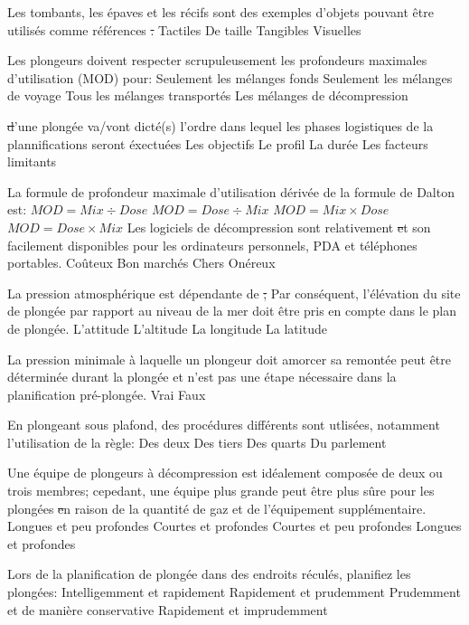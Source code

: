 \documentclass[english,10pt,twoside]{article}
\begin{document}
\begin{outline}
		\1 Les tombants, les épaves et les récifs sont des exemples d'objets pouvant être utilisés comme références \st.
			\2 Tactiles
			\2 De taille
			\2 Tangibles
			\2 Visuelles

		\1 Les plongeurs doivent respecter scrupuleusement les profondeurs maximales d'utilisation (MOD) pour:
			\2 Seulement les mélanges fonds
			\2 Seulement les mélanges de voyage
			\2 Tous les mélanges transportés
			\2 Les mélanges de décompression

		\1 \st d'une plongée va/vont dicté(s) l'ordre dans lequel les phases logistiques de la plannifications seront éxectuées
			\2 Les objectifs
			\2 Le profil
			\2 La durée
			\2 Les facteurs limitants

		\1 La formule de profondeur maximale d'utilisation dérivée de la formule de Dalton est:
			\2 $MOD = Mix \div Dose$
			\2 $MOD = Dose \div Mix$
			\2 $MOD = Mix \times Dose$
			\2 $MOD = Dose \times Mix$
		\1 Les logiciels de décompression sont relativement \st et son facilement disponibles pour les ordinateurs personnels, PDA et téléphones portables.
			\2 Coûteux
			\2 Bon marchés
			\2 Chers
			\2 Onéreux

		\1 La pression atmosphérique est dépendante de \st; Par conséquent, l'élévation du site de plongée par rapport au niveau de la mer doit être pris en compte dans le plan de plongée.
			\2 L'attitude
			\2 L'altitude
			\2 La longitude
			\2 La latitude

		\1 La pression minimale à laquelle un plongeur doit amorcer sa remontée peut être déterminée durant la plongée et n'est pas une étape nécessaire dans la planification pré-plongée.
			\2 Vrai
			\2 Faux

		\1 En plongeant sous plafond, des procédures différents sont utlisées, notamment l'utilisation de la règle:
			\2 Des deux
			\2 Des tiers
			\2 Des quarts
			\2 Du parlement

		\1 Une équipe de plongeurs à décompression est idéalement composée de deux ou trois membres; cepedant, une équipe plus grande peut être plus sûre pour les plongées \st en raison de la quantité de gaz et de l'équipement supplémentaire.
			\2 Longues et peu profondes
			\2 Courtes et profondes
			\2 Courtes et peu profondes
			\2 Longues et profondes

		\1 Lors de la planification de plongée dans des endroits réculés, planifiez les plongées:
			\2 Intelligemment et rapidement
			\2 Rapidement et prudemment
			\2 Prudemment et de manière conservative
			\2 Rapidement et imprudemment


\end{outline}
\end{document}
